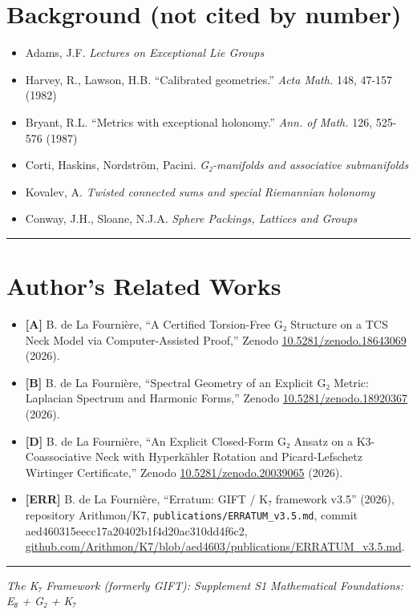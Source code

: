 \documentclass[11pt,a4paper]{article}
\begin{document}
\section{Background (not cited by number)}\label{background-not-cited-by-number}

\begin{itemize}
\tightlist
\item
  Adams, J.F. \emph{Lectures on Exceptional Lie Groups}
\item
  Harvey, R., Lawson, H.B. ``Calibrated geometries.'' \emph{Acta Math.} 148, 47-157 (1982)
\item
  Bryant, R.L. ``Metrics with exceptional holonomy.'' \emph{Ann. of Math.} 126, 525-576 (1987)
\item
  Corti, Haskins, Nordström, Pacini. \emph{G₂-manifolds and associative submanifolds}
\item
  Kovalev, A. \emph{Twisted connected sums and special Riemannian holonomy}
\item
  Conway, J.H., Sloane, N.J.A. \emph{Sphere Packings, Lattices and Groups}
\end{itemize}

\begin{center}\rule{\linewidth}{0.5pt}\end{center}

\section{Author's Related Works}\label{authors-related-works}

\begin{itemize}
\tightlist
\item
  \textbf{{[}A{]}} B. de La Fournière, ``A Certified Torsion-Free G₂ Structure on a TCS Neck Model via Computer-Assisted Proof,'' Zenodo \href{https://doi.org/10.5281/zenodo.18643069}{10.5281/zenodo.18643069} (2026).
\item
  \textbf{{[}B{]}} B. de La Fournière, ``Spectral Geometry of an Explicit G₂ Metric: Laplacian Spectrum and Harmonic Forms,'' Zenodo \href{https://doi.org/10.5281/zenodo.18920367}{10.5281/zenodo.18920367} (2026).
\item
  \textbf{{[}D{]}} B. de La Fournière, ``An Explicit Closed-Form G₂ Ansatz on a K3-Coassociative Neck with Hyperkähler Rotation and Picard-Lefschetz Wirtinger Certificate,'' Zenodo \href{https://doi.org/10.5281/zenodo.20039065}{10.5281/zenodo.20039065} (2026).
\item
  \textbf{{[}ERR{]}} B. de La Fournière, ``Erratum: GIFT / K₇ framework v3.5'' (2026), repository Arithmon/K7, \texttt{publications/\allowbreak{}ERRATUM\_\allowbreak{}v3.\allowbreak{}5.\allowbreak{}md}, commit aed460315eecc17a20402b1f4d20ac310dd4f6c2, \href{https://github.com/Arithmon/K7/blob/aed460315eecc17a20402b1f4d20ac310dd4f6c2/publications/ERRATUM_v3.5.md}{github.com/Arithmon/K7/blob/aed4603/publications/ERRATUM\_\allowbreak{}v3.5.md}.
\end{itemize}

\begin{center}\rule{\linewidth}{0.5pt}\end{center}

\emph{The K₇ Framework (formerly GIFT): Supplement S1} \emph{Mathematical Foundations: E₈ + G₂ + K₇}


\bigskip

\end{document}
